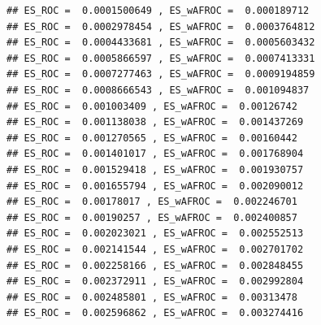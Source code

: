 \documentclass[
]{book}
\newenvironment{Shaded}{\begin{snugshade}}{\end{snugshade}}
\newcommand{\CharTok}[1]{\textcolor[rgb]{0.31,0.60,0.02}{#1}}
\newcommand{\CommentTok}[1]{\textcolor[rgb]{0.56,0.35,0.01}{\textit{#1}}}
\newcommand{\ControlFlowTok}[1]{\textcolor[rgb]{0.13,0.29,0.53}{\textbf{#1}}}
\newcommand{\DataTypeTok}[1]{\textcolor[rgb]{0.13,0.29,0.53}{#1}}
\newcommand{\DecValTok}[1]{\textcolor[rgb]{0.00,0.00,0.81}{#1}}
\newcommand{\FloatTok}[1]{\textcolor[rgb]{0.00,0.00,0.81}{#1}}
\newcommand{\KeywordTok}[1]{\textcolor[rgb]{0.13,0.29,0.53}{\textbf{#1}}}
\newcommand{\NormalTok}[1]{#1}
\newcommand{\OperatorTok}[1]{\textcolor[rgb]{0.81,0.36,0.00}{\textbf{#1}}}
\newcommand{\StringTok}[1]{\textcolor[rgb]{0.31,0.60,0.02}{#1}}
\begin{document}
\begin{Shaded}
\end{Shaded}

\begin{verbatim}
## ES_ROC =  0.0001500649 , ES_wAFROC =  0.000189712 
## ES_ROC =  0.0002978454 , ES_wAFROC =  0.0003764812 
## ES_ROC =  0.0004433681 , ES_wAFROC =  0.0005603432 
## ES_ROC =  0.0005866597 , ES_wAFROC =  0.0007413331 
## ES_ROC =  0.0007277463 , ES_wAFROC =  0.0009194859 
## ES_ROC =  0.0008666543 , ES_wAFROC =  0.001094837 
## ES_ROC =  0.001003409 , ES_wAFROC =  0.00126742 
## ES_ROC =  0.001138038 , ES_wAFROC =  0.001437269 
## ES_ROC =  0.001270565 , ES_wAFROC =  0.00160442 
## ES_ROC =  0.001401017 , ES_wAFROC =  0.001768904 
## ES_ROC =  0.001529418 , ES_wAFROC =  0.001930757 
## ES_ROC =  0.001655794 , ES_wAFROC =  0.002090012 
## ES_ROC =  0.00178017 , ES_wAFROC =  0.002246701 
## ES_ROC =  0.00190257 , ES_wAFROC =  0.002400857 
## ES_ROC =  0.002023021 , ES_wAFROC =  0.002552513 
## ES_ROC =  0.002141544 , ES_wAFROC =  0.002701702 
## ES_ROC =  0.002258166 , ES_wAFROC =  0.002848455 
## ES_ROC =  0.002372911 , ES_wAFROC =  0.002992804 
## ES_ROC =  0.002485801 , ES_wAFROC =  0.00313478 
## ES_ROC =  0.002596862 , ES_wAFROC =  0.003274416
\end{verbatim}
\end{document}
